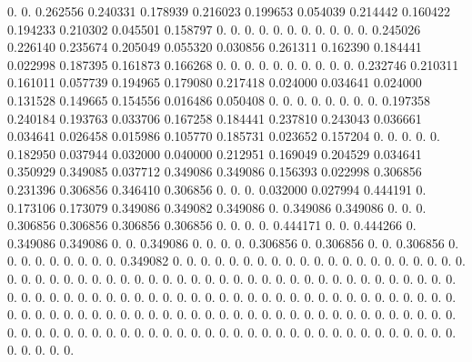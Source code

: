 0.  0.  0.262556   0.240331   0.178939   0.216023   0.199653   0.054039   0.214442   0.160422   0.194233   0.210302   0.045501   0.158797   0.  0.  0.  0.  0.  0.  0.  0.  0.  
0.  0.  0.245026   0.226140   0.235674   0.205049   0.055320   0.030856   0.261311   0.162390   0.184441   0.022998   0.187395   0.161873   0.166268   0.  0.  0.  0.  0.  0.  0.  0.  
0.  0.  0.232746   0.210311   0.161011   0.057739   0.194965   0.179080   0.217418   0.024000   0.034641   0.024000   0.131528   0.149665   0.154556   0.016486   0.050408   0.  0.  0.  0.  0.  0.  
0.  0.  0.197358   0.240184   0.193763   0.033706   0.167258   0.184441   0.237810   0.243043   0.036661   0.034641   0.026458   0.015986   0.105770   0.185731   0.023652   0.157204   0.  0.  0.  0.  0.  
0.182950   0.037944   0.032000   0.040000   0.212951   0.169049   0.204529   0.034641   0.350929   0.349085   0.037712   0.349086   0.349086   0.156393   0.022998   0.306856   0.231396   0.306856   0.346410   0.306856   0.  0.  0.  
0.032000   0.027994   0.444191   0.  0.173106   0.173079   0.349086   0.349082   0.349086   0.  0.349086   0.349086   0.  0.  0.  0.306856   0.306856   0.306856   0.306856   0.  0.  0.  0.  
0.444171   0.  0.  0.444266   0.  0.349086   0.349086   0.  0.  0.349086   0.  0.  0.  0.  0.306856   0.  0.306856   0.  0.  0.306856   0.  0.  0.  
0.  0.  0.  0.  0.  0.  0.349082   0.  0.  0.  0.  0.  0.  0.  0.  0.  0.  0.  0.  0.  0.  0.  0.  
0.  0.  0.  0.  0.  0.  0.  0.  0.  0.  0.  0.  0.  0.  0.  0.  0.  0.  0.  0.  0.  0.  0.  
0.  0.  0.  0.  0.  0.  0.  0.  0.  0.  0.  0.  0.  0.  0.  0.  0.  0.  0.  0.  0.  0.  0.  
0.  0.  0.  0.  0.  0.  0.  0.  0.  0.  0.  0.  0.  0.  0.  0.  0.  0.  0.  0.  0.  0.  0.  
0.  0.  0.  0.  0.  0.  0.  0.  0.  0.  0.  0.  0.  0.  0.  0.  0.  0.  0.  0.  0.  0.  0.  
0.  0.  0.  0.  0.  0.  0.  0.  0.  0.  0.  0.  0.  0.  0.  0.  0.  0.  0.  0.  0.  0.  0.  
0.  0.  0.  0.  0.  0.  0.  0.  0.  0.  0.  0.  0.  0.  0.  0.  0.  0.  0.  0.  0.  0.  0.  
